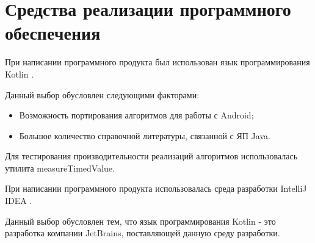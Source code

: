 \documentclass[12pt]{report}
\begin{document}
\section{Средства реализации программного обеспечения}
При написании программного продукта был использован язык программирования Kotlin \cite{Kotlin}.

Данный выбор обусловлен следующими факторами:
\begin{itemize}
\item Возможность портирования алгоритмов для работы с Android;
\item Большое количество справочной литературы, связанной с ЯП Java.
\end{itemize}

Для тестирования производительности реализаций алгоритмов использовалась утилита measureTimedValue.

При написании программного продукта использовалась среда разработки IntelliJ IDEA \cite{IntelliJ}.

Данный выбор обусловлен тем, что язык программирования Kotlin - это разработка компании JetBrains, поставляющей данную среду разработки.
\end{document}
